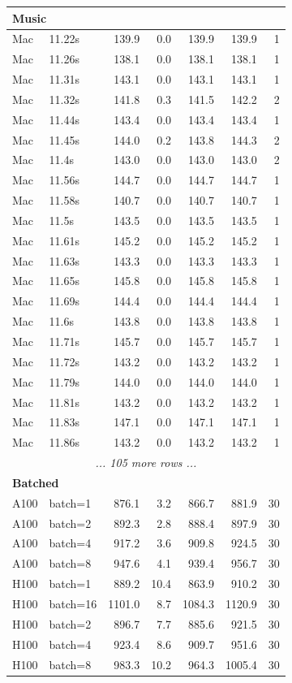 \documentclass[11pt]{article}
\begin{document}
\begin{longtable}{llrrrrr}
\midrule
\multicolumn{8}{l}{\textbf{Music}} \\
\midrule
Mac & 11.22s & 139.9 & 0.0 & 139.9 & 139.9 & 1 \\
Mac & 11.26s & 138.1 & 0.0 & 138.1 & 138.1 & 1 \\
Mac & 11.31s & 143.1 & 0.0 & 143.1 & 143.1 & 1 \\
Mac & 11.32s & 141.8 & 0.3 & 141.5 & 142.2 & 2 \\
Mac & 11.44s & 143.4 & 0.0 & 143.4 & 143.4 & 1 \\
Mac & 11.45s & 144.0 & 0.2 & 143.8 & 144.3 & 2 \\
Mac & 11.4s & 143.0 & 0.0 & 143.0 & 143.0 & 2 \\
Mac & 11.56s & 144.7 & 0.0 & 144.7 & 144.7 & 1 \\
Mac & 11.58s & 140.7 & 0.0 & 140.7 & 140.7 & 1 \\
Mac & 11.5s & 143.5 & 0.0 & 143.5 & 143.5 & 1 \\
Mac & 11.61s & 145.2 & 0.0 & 145.2 & 145.2 & 1 \\
Mac & 11.63s & 143.3 & 0.0 & 143.3 & 143.3 & 1 \\
Mac & 11.65s & 145.8 & 0.0 & 145.8 & 145.8 & 1 \\
Mac & 11.69s & 144.4 & 0.0 & 144.4 & 144.4 & 1 \\
Mac & 11.6s & 143.8 & 0.0 & 143.8 & 143.8 & 1 \\
Mac & 11.71s & 145.7 & 0.0 & 145.7 & 145.7 & 1 \\
Mac & 11.72s & 143.2 & 0.0 & 143.2 & 143.2 & 1 \\
Mac & 11.79s & 144.0 & 0.0 & 144.0 & 144.0 & 1 \\
Mac & 11.81s & 143.2 & 0.0 & 143.2 & 143.2 & 1 \\
Mac & 11.83s & 147.1 & 0.0 & 147.1 & 147.1 & 1 \\
Mac & 11.86s & 143.2 & 0.0 & 143.2 & 143.2 & 1 \\
\multicolumn{8}{c}{\textit{... 105 more rows ...}} \\
\midrule
\multicolumn{8}{l}{\textbf{Batched}} \\
\midrule
A100 & batch=1 & 876.1 & 3.2 & 866.7 & 881.9 & 30 \\
A100 & batch=2 & 892.3 & 2.8 & 888.4 & 897.9 & 30 \\
A100 & batch=4 & 917.2 & 3.6 & 909.8 & 924.5 & 30 \\
A100 & batch=8 & 947.6 & 4.1 & 939.4 & 956.7 & 30 \\
H100 & batch=1 & 889.2 & 10.4 & 863.9 & 910.2 & 30 \\
H100 & batch=16 & 1101.0 & 8.7 & 1084.3 & 1120.9 & 30 \\
H100 & batch=2 & 896.7 & 7.7 & 885.6 & 921.5 & 30 \\
H100 & batch=4 & 923.4 & 8.6 & 909.7 & 951.6 & 30 \\
H100 & batch=8 & 983.3 & 10.2 & 964.3 & 1005.4 & 30 \\

\bottomrule
\end{longtable}
\end{document}
